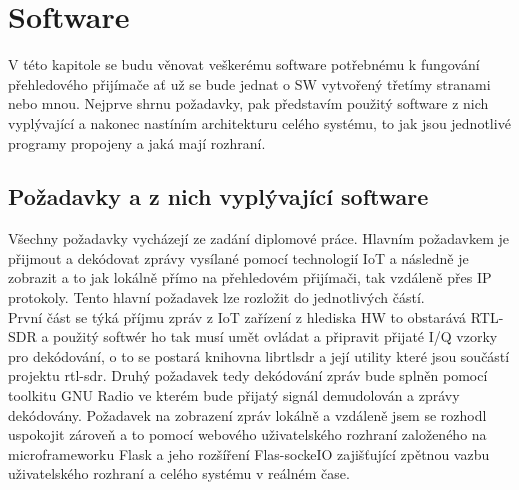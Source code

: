 \documentclass{ctuthesis}
\begin{document}
\chapter{Software}

V této kapitole se budu věnovat veškerému software potřebnému k fungování přehledového přijímače ať už se bude jednat o SW vytvořený třetímy stranami nebo mnou. Nejprve shrnu požadavky, pak představím použitý software z nich vyplývající a nakonec nastíním architekturu celého systému, to jak jsou jednotlivé programy propojeny a jaká mají rozhraní.
\section{Požadavky a z nich vyplývající software}
Všechny požadavky vycházejí ze zadání diplomové práce. Hlavním požadavkem je přijmout a dekódovat zprávy vysílané pomocí technologií IoT a následně je zobrazit a to jak lokálně přímo na přehledovém přijímači, tak vzdáleně přes IP protokoly. Tento hlavní požadavek lze rozložit do jednotlivých částí.\\ 
První část se týká příjmu zpráv z IoT zařízení z hlediska HW to obstarává RTL-SDR a použitý softwér ho tak musí umět ovládat a připravit přijaté I/Q vzorky pro dekódování, o to se postará knihovna librtlsdr a její utility které jsou součástí projektu rtl-sdr. Druhý požadavek tedy dekódování zpráv bude splněn pomocí toolkitu GNU Radio ve kterém bude přijatý signál demudolován a zprávy dekódovány.  Požadavek na zobrazení zpráv lokálně a vzdáleně jsem se rozhodl uspokojit zároveň a to pomocí webového uživatelského rozhraní založeného na microframeworku Flask a jeho rozšíření Flas-sockeIO zajišťující zpětnou vazbu uživatelského rozhraní a celého systému v reálném čase.\\
\end{document}
